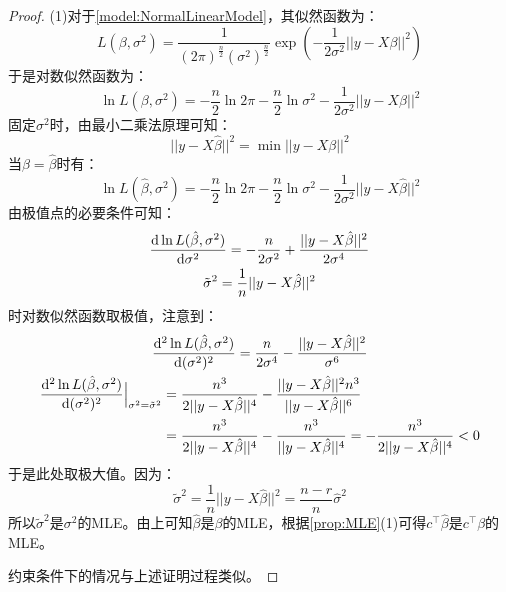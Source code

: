 \begin{proof}
	(1)对于\cref{model:NormalLinearModel}，其似然函数为：
	\begin{equation*}
		L(\beta,\sigma^2)=\frac{1}{(2\pi)^{\frac{n}{2}}(\sigma^2)^\frac{n}{2}}\exp\left(-\frac{1}{2\sigma^2}||y-X\beta||^2\right)
	\end{equation*}
	于是对数似然函数为：
	\begin{equation*}
		\ln L(\beta,\sigma^2)=-\frac{n}{2}\ln2\pi-\frac{n}{2}\ln\sigma^2-\frac{1}{2\sigma^2}||y-X\beta||^2
	\end{equation*}
	固定$\sigma^2$时，由最小二乘法原理可知：
	\begin{equation*}
		||y-X\hat{\beta}||^2=\min||y-X\beta||^2
	\end{equation*}
	当$\beta=\hat{\beta}$时有：
	\begin{equation*}
		\ln L(\hat{\beta},\sigma^2)=-\frac{n}{2}\ln2\pi-\frac{n}{2}\ln\sigma^2-\frac{1}{2\sigma^2}||y-X\hat{\beta}||^2
	\end{equation*}
	由极值点的必要条件可知：
	\begin{gather*}
		\frac{\mathop{}\!\mathrm{d}\ln L(\hat{\beta},\sigma^2)}{\mathop{}\!\mathrm{d} \sigma^2}=-\frac{n}{2\sigma^2}+\frac{||y-X\hat{\beta}||^2}{2\sigma^4} \\
		\tilde{\sigma}^2=\frac{1}{n}||y-X\hat{\beta}||^2
	\end{gather*}
	时对数似然函数取极值，注意到：
	\begin{gather*}
		\frac{\mathop{}\!\mathrm{d}^2\ln L(\hat{\beta},\sigma^2)}{\mathop{}\!\mathrm{d} (\sigma^2)^2}=\frac{n}{2\sigma^4}-\frac{||y-X\hat{\beta}||^2}{\sigma^6} \\
		\begin{aligned}
			\frac{\mathop{}\!\mathrm{d}^2\ln L(\hat{\beta},\sigma^2)}{\mathop{}\!\mathrm{d} (\sigma^2)^2}\Big|_{\sigma^2=\tilde{\sigma}^2}&=\frac{n^3}{2||y-X\hat{\beta}||^4}-\frac{||y-X\hat{\beta}||^2n^3}{||y-X\hat{\beta}||^6} \\
			&=\frac{n^3}{2||y-X\hat{\beta}||^4}-\frac{n^3}{||y-X\hat{\beta}||^4}=-\frac{n^3}{2||y-X\hat{\beta}||^4}<0
		\end{aligned}
	\end{gather*}
	于是此处取极大值。因为：
	\begin{equation*}
		\tilde{\sigma}^2=\frac{1}{n}||y-X\hat{\beta}||^2=\frac{n-r}{n}\hat{\sigma}^2
	\end{equation*}
	所以$\tilde{\sigma}^2$是$\sigma^2$的MLE。由上可知$\hat{\beta}$是$\beta$的MLE，根据\cref{prop:MLE}(1)可得$c^{\top}\hat{\beta}$是$c^{\top}\beta$的MLE。\par
	约束条件下的情况与上述证明过程类似。\par

\end{proof}
